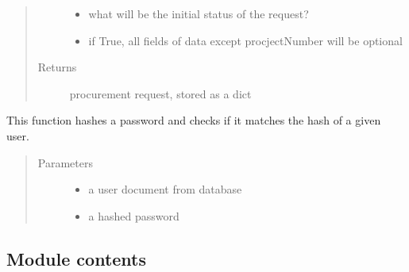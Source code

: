 \documentclass[letterpaper,10pt,english]{sphinxmanual}
\begin{document}
\begin{fulllineitems}
\begin{quote}
\begin{description}
\begin{itemize}
\item {} 
 \textendash{} what will be the initial status of the request?

\item {} 
 \textendash{} if True, all fields of data except procjectNumber will be optional

\end{itemize}

\item[{Returns}] \leavevmode
procurement request, stored as a dict

\end{description}\end{quote}

\end{fulllineitems}


\begin{fulllineitems}
\label{\detokenize{apidoc/utdesign_procurement:utdesign_procurement.utils.verifyPassword}}
This function hashes a password and checks if it matches the hash of
a given user.
\begin{quote}\begin{description}
\item[{Parameters}] \leavevmode\begin{itemize}
\item {} 
 \textendash{} a user document from database

\item {} 
 \textendash{} a hashed password

\end{itemize}

\end{description}\end{quote}

\end{fulllineitems}



\subsection{Module contents}
\label{\detokenize{apidoc/utdesign_procurement:module-utdesign_procurement}}\label{\detokenize{apidoc/utdesign_procurement:module-contents}}
\end{document}
